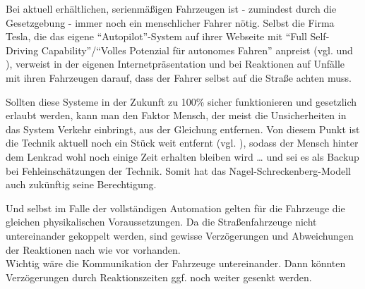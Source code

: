 Bei aktuell erhältlichen, serienmäßigen Fahrzeugen ist - zumindest durch die Gesetzgebung - immer noch ein menschlicher Fahrer nötig.
Selbst die Firma Tesla, die das eigene \enquote{Autopilot}-System auf ihrer Webseite mit \enquote{Full Self-Driving Capability}/\enquote{Volles Potenzial für autonomes Fahren} anpreist (vgl. \cite{tesla-en} und \cite{tesla-de}), verweist in der eigenen Internetpräsentation und bei Reaktionen auf Unfälle mit ihren Fahrzeugen darauf, dass der Fahrer selbst auf die Straße achten muss. \cite{firetruck-accident}

Sollten diese Systeme in der Zukunft zu 100\% sicher funktionieren und gesetzlich erlaubt werden, kann man den Faktor Mensch, der meist die Unsicherheiten in das System Verkehr einbringt, aus der Gleichung entfernen.
Von diesem Punkt ist die Technik aktuell noch ein Stück weit entfernt (vgl. \cite{how-far-is-autonomous-driving}), sodass der Mensch hinter dem Lenkrad wohl noch einige Zeit erhalten bleiben wird \ldots\hspace{0.05em} und sei es als Backup bei Fehleinschätzungen der Technik.
Somit hat das Nagel-Schreckenberg-Modell auch zukünftig seine Berechtigung.

Und selbst im Falle der vollständigen Automation gelten für die Fahrzeuge die gleichen physikalischen Voraussetzungen.
Da die Straßenfahrzeuge nicht untereinander gekoppelt werden, sind gewisse Verzögerungen und Abweichungen der Reaktionen nach wie vor vorhanden.
\\
Wichtig wäre die Kommunikation der Fahrzeuge untereinander.
Dann könnten Verzögerungen durch Reaktionszeiten ggf. noch weiter gesenkt werden.
